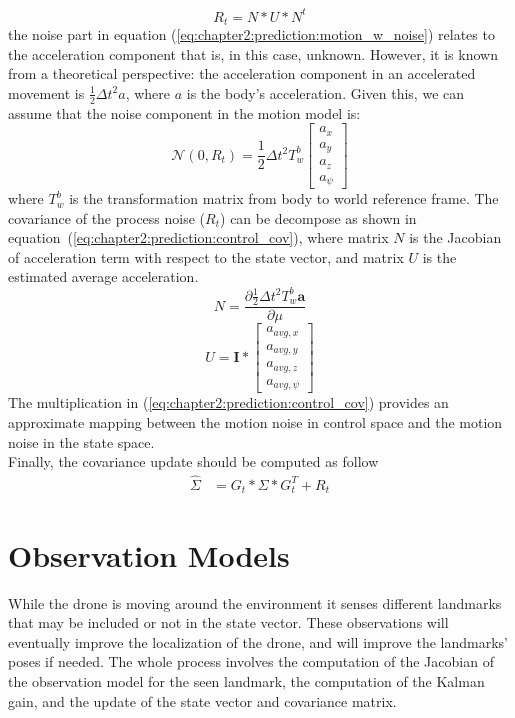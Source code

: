 \begin{equation}
    R_t = N * U * N^t
    \label{eq:chapter2:prediction:control_cov}
\end{equation}
the noise part in equation (\ref{eq:chapter2:prediction:motion_w_noise}) relates to the acceleration component that is, in this case, unknown. However, it is known from a theoretical perspective: the acceleration component in an accelerated movement is $\frac{1}{2}\Delta t^2 a$, where $a$ is the body's acceleration. Given this, we can assume that the noise component in the motion model is:
\begin{equation}
    \mathcal{N}\left(0, R_t\right) = \frac{1}{2} \Delta t^2 T_w^b \begin{bmatrix}
        a_x \\ a_y \\ a_z \\ a_{\psi}
    \end{bmatrix}
\end{equation}
where $T_w^b$ is the transformation matrix from body to world reference frame. The covariance of the process noise ($R_t$) can be decompose as shown in equation~(\ref{eq:chapter2:prediction:control_cov}), where matrix $N$ is the Jacobian of acceleration term  with respect to the state vector, and matrix $U$ is the estimated average acceleration.
\begin{equation}
    N = \frac{\partial \frac{1}{2} \Delta t^2 T_w^b \textbf{a}}{\partial \mu}
\end{equation}
\begin{equation}
    U = \textbf{I} * \begin{bmatrix}
        a_{avg, x} \\ a_{avg, y} \\ a_{avg, z} \\ a_{avg, \psi}
    \end{bmatrix}
\end{equation}
The multiplication in (\ref{eq:chapter2:prediction:control_cov}) provides an approximate mapping between the motion noise in control space and the motion noise in the state space.\\

Finally, the covariance update should be computed as follow
\begin{align}
    \hat\Sigma &= G_t * \Sigma * G_t^T + R_t
\end{align}

\section{Observation Models}
\label{sec:chapter2:correction}
While the drone is moving around the environment it senses different landmarks that may be included or not in the state vector. These observations will eventually improve the localization of the drone, and will improve the landmarks' poses if needed. The whole process involves the computation of the Jacobian of the observation model for the seen landmark, the computation of the Kalman gain, and the update of the state vector and covariance matrix.\\

